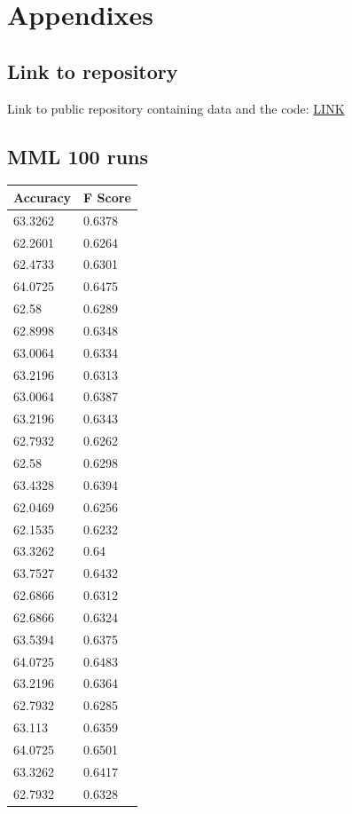 \section{Appendixes}

\subsection{Link to repository}
Link to public repository containing data and the code: \href{https://github.com/steffan267/Sentiment-Analysis-on-Danish-Social-Media}{LINK}

\subsection{MML 100 runs}
\begin{longtable}{@{}ll@{}}
	\toprule
	Accuracy & F Score \\ \midrule
	63.3262  & 0.6378  \\
	62.2601  & 0.6264  \\
	62.4733  & 0.6301  \\
	64.0725  & 0.6475  \\
	62.58    & 0.6289  \\
	62.8998  & 0.6348  \\
	63.0064  & 0.6334  \\
	63.2196  & 0.6313  \\
	63.0064  & 0.6387  \\
	63.2196  & 0.6343  \\
	62.7932  & 0.6262  \\
	62.58    & 0.6298  \\
	63.4328  & 0.6394  \\
	62.0469  & 0.6256  \\
	62.1535  & 0.6232  \\
	63.3262  & 0.64    \\
	63.7527  & 0.6432  \\
	62.6866  & 0.6312  \\
	62.6866  & 0.6324  \\
	63.5394  & 0.6375  \\
	64.0725  & 0.6483  \\
	63.2196  & 0.6364  \\
	62.7932  & 0.6285  \\
	63.113   & 0.6359  \\
	64.0725  & 0.6501  \\
	63.3262  & 0.6417  \\
	62.7932  & 0.6328  \\

\end{longtable}
